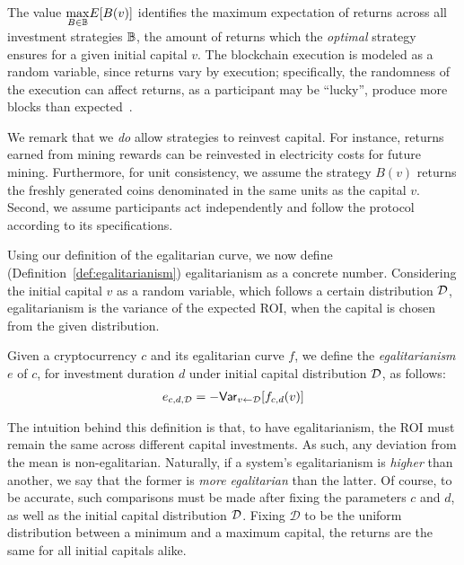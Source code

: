 The value $\underset{B \in \mathbb{B}}{\max}{E[B(v)]}$ identifies the maximum
expectation of returns across all investment strategies $\mathbb{B}$, \ie the
amount of returns which the \emph{optimal} strategy ensures for a given initial
capital $v$. The blockchain execution is modeled as a random variable, since
returns vary by execution; specifically, the randomness of the execution can
affect returns, as a participant may be ``lucky'', \ie produce more blocks than
expected~\cite{FC:FKORVW19}.

We remark that we \emph{do} allow strategies to reinvest capital. For instance,
returns earned from mining rewards can be reinvested in electricity costs for
future mining. Furthermore, for unit consistency, we assume the strategy $B(v)$
returns the freshly generated coins denominated in the same units as the
capital $v$. Second, we assume participants act independently and follow the
protocol according to its specifications.

Using our definition of the egalitarian curve, we now define
(Definition~\ref{def:egalitarianism}) egalitarianism as a concrete number.
Considering the initial capital $v$ as a random variable, which follows a
certain distribution $\mathcal{D}$, egalitarianism is the variance of the expected
ROI, when the capital is chosen from the given distribution.

\begin{definition}[Egalitarianism]\label{def:egalitarianism}
    Given a cryptocurrency $c$ and its egalitarian curve $f$, we define the
    \emph{egalitarianism} $e$ of $c$, for investment duration $d$ under initial
    capital distribution $\mathcal{D}$, as follows:
    \begin{align}
      e_{c, d, \mathcal{D}} = -\mathsf{Var}_{v \gets \mathcal{D}}[f_{c, d}(v)]
    \end{align}
\end{definition}

The intuition behind this definition is that, to have egalitarianism, the ROI
must remain the same across different capital investments. As such, any
deviation from the mean is non-egalitarian. Naturally, if a system's
egalitarianism is \emph{higher} than another, we say that the former is
\emph{more egalitarian} than the latter. Of course, to be accurate, such
comparisons must be made after fixing the parameters $c$ and $d$, as well as
the initial capital distribution $\mathcal{D}$. Fixing $\mathcal{D}$ to be the
uniform distribution between a minimum and a maximum capital, the returns are
the same for all initial capitals alike.

